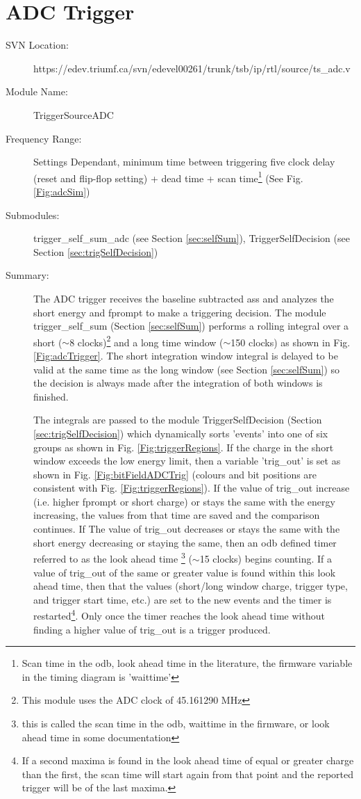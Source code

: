 \clearpage
\section{ADC Trigger}
\label{sec:adcTrig}
\begin{description}
\item[SVN Location: ]https://edev.triumf.ca/svn/edevel00261/trunk/tsb/ip/rtl/source/ts\_adc.v
\item[Module Name: ]TriggerSourceADC
\item[Frequency Range: ]Settings Dependant, minimum time between triggering five clock delay (reset and flip-flop setting) + dead time + scan time\footnote{Scan time in the \gls{odb}, look ahead time in the literature, the firmware variable in the timing diagram is 'waittime'} (See Fig. \ref{Fig:adcSim})
\item[Submodules: ]trigger\_self\_sum\_adc (see Section \ref{sec:selfSum}), TriggerSelfDecision (see Section \ref{sec:trigSelfDecision})
\item[Summary: ]The ADC trigger receives the baseline subtracted \gls{ass} and analyzes the short energy and \gls{fprompt} to make a triggering decision. The module trigger\_self\_sum (Section \ref{sec:selfSum}) performs a rolling integral over a short ($\sim$8 clocks)\footnote{This module uses the ADC clock of 45.161290 MHz} and a long time window ($\sim$150 clocks) as shown in Fig. \ref{Fig:adcTrigger}. The short integration window integral is delayed to be valid at the same time as the long window (see Section \ref{sec:selfSum}) so the decision is always made after the integration of both windows is finished.

The integrals are passed to the module TriggerSelfDecision (Section \ref{sec:trigSelfDecision}) which dynamically sorts 'events' into one of six groups as shown in Fig. \ref{Fig:triggerRegions}. If the charge in the short window exceeds the low energy limit, then a variable 'trig\_out' is set as shown in Fig. \ref{Fig:bitFieldADCTrig} (colours and bit positions are consistent with Fig. \ref{Fig:triggerRegions}). If the value of trig\_out increase (i.e. higher \gls{fprompt} or short charge) or stays the same with the energy increasing, the values from that time are saved and the comparison continues. If The value of trig\_out decreases or stays the same with the short energy decreasing or staying the same, then an \gls{odb} defined timer referred to as the look ahead time \footnote{this is called the scan time in the \gls{odb}, waittime in the firmware, or look ahead time in some documentation} ($\sim$15 clocks) begins counting. If a value of trig\_out of the same or greater value is found within this look ahead time, then that the values (short/long window charge, trigger type, and trigger start time, etc.) are set to the new events and the timer is restarted\footnote{If a second maxima is found in the look ahead time of equal or greater charge than the first, the scan time will start again from that point and the reported trigger will be of the last maxima.}. Only once the timer reaches the look ahead time without finding a higher value of trig\_out is a trigger produced.


\end{description}
